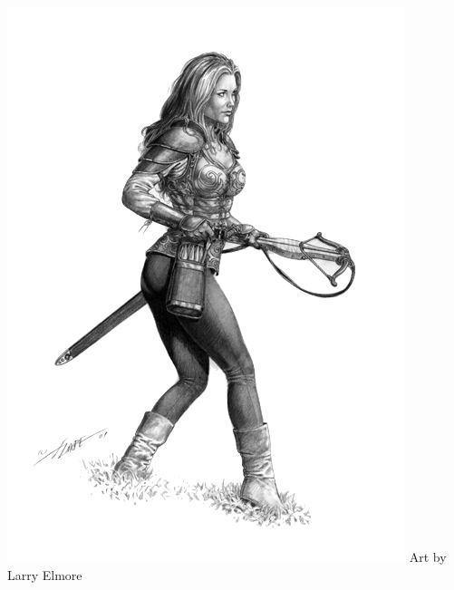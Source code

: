 \begin{multicols*}{2}
\begin{Figure}
\centering
\includegraphics[width=\textwidth]{img/female-rogue.png}
{\scriptsize Art by Larry Elmore}
\end{Figure}
    
\end{multicols*}


\clearpage

